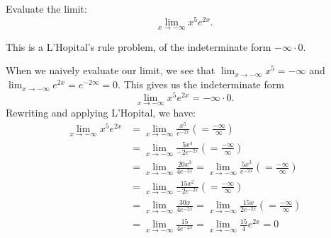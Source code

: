 \documentclass{ximera}
\author{Emma Smith Zbarsky\and Nela Lakos}
\begin{document}
\begin{exercise}

Evaluate the limit: \[\lim_{x \to -\infty} x^5e^{2x}.\]


\begin{hint}
This is a L'Hopital's rule problem, of the indeterminate form
$-\infty \cdot 0.$
\end{hint}


\begin{hint}
When we naively evaluate our limit, we see that
$\lim_{x\to -\infty} x^5 = -\infty$ and
$\lim_{x\to -\infty} e^{2x} = e^{-2\infty} = 0.$ This gives us the
indeterminate form \[\lim_{x\to -\infty} x^5e^{2x} = -\infty\cdot 0.\]
Rewriting and applying L'Hopital, we have: \begin{align*}
\lim_{x\to -\infty} x^5e^{2x} &= \lim_{x\to -\infty} \frac{x^5}{e^{-2x}} \left(=\frac{-\infty}{\infty}\right)\\
&= \lim_{x\to -\infty} \frac{5x^4}{-2e^{-2x}} \left(=\frac{-\infty}{\infty}\right)\\
&= \lim_{x\to -\infty} \frac{20x^3}{4e^{-2x}} = \lim_{x\to -\infty} \frac{5x^3}{e^{-2x}} \left(=\frac{-\infty}{\infty}\right)\\
&= \lim_{x\to -\infty} \frac{15x^2}{-2e^{-2x}}  \left(=\frac{-\infty}{\infty}\right)\\
&= \lim_{x\to -\infty} \frac{30x}{4e^{-2x}}= \lim_{x\to -\infty} \frac{15x}{2e^{-2x}}  \left(=\frac{-\infty}{\infty}\right)\\
&= \lim_{x\to -\infty} \frac{15}{4e^{-2x}} = \lim_{x\to -\infty} \frac{15}{4}e^{2x} = 0
\end{align*}
\end{hint}


\begin{multipleChoice}
\choice{$\infty$}
\choice{$-\infty$}
\end{multipleChoice}

\end{exercise}
\end{document}
